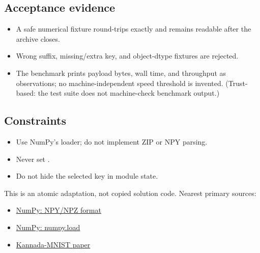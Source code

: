         \subsection{Acceptance evidence}

        \begin{evidencebox}
        \begin{itemize}
          \item A safe numerical fixture round-trips exactly and remains readable after the archive closes.
  \item Wrong suffix, missing/extra key, and object-dtype fixtures are rejected.
  \item The benchmark prints payload bytes, wall time, and throughput as observations; no machine-independent speed threshold is invented. (Trust-based: the test suite does not machine-check benchmark output.)
        \end{itemize}
        \end{evidencebox}

        \subsection{Constraints}

        \begin{itemize}
          \item Use NumPy's loader; do not implement ZIP or NPY parsing.
  \item Never set .
  \item Do not hide the selected key in module state.
        \end{itemize}

        \begin{sourcebox}
        This is an atomic adaptation, not copied solution code. Nearest primary sources:
        \begin{itemize}
          \item \href{https://numpy.org/doc/stable/reference/generated/numpy.lib.format.html}{NumPy: NPY/NPZ format}
  \item \href{https://numpy.org/doc/stable/reference/generated/numpy.load.html}{NumPy: numpy.load}
  \item \href{https://arxiv.org/abs/1908.01242}{Kannada-MNIST paper}
        \end{itemize}
        \end{sourcebox}
